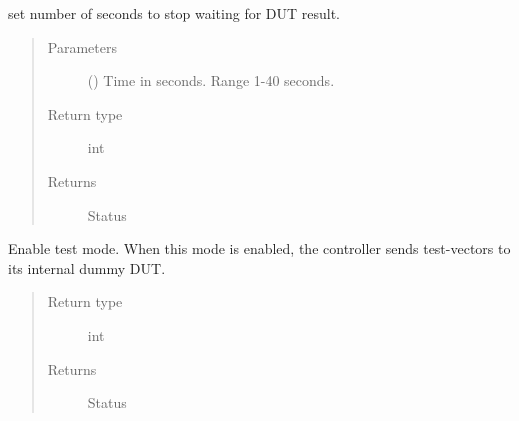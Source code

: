 \documentclass[letterpaper,10pt,english]{sphinxmanual}
\begin{document}
\begin{fulllineitems}
\begin{fulllineitems}
\begin{fulllineitems}
\end{fulllineitems}


\end{fulllineitems}


\begin{fulllineitems}
\label{\detokenize{reference_doc:fobos.Basys3Ctrl.setTimeout}}
set number of seconds to stop waiting for DUT result.
\begin{quote}\begin{description}
\item[{Parameters}] \leavevmode
{} () \textendash{} Time in seconds. Range 1-40 seconds.

\item[{Return type}] \leavevmode
int

\item[{Returns}] \leavevmode
Status

\end{description}\end{quote}

\end{fulllineitems}


\begin{fulllineitems}
\label{\detokenize{reference_doc:fobos.Basys3Ctrl.enableTestMode}}
Enable test mode. When this mode is enabled, the controller sends test-vectors to its internal dummy DUT.
\begin{quote}\begin{description}
\item[{Return type}] \leavevmode
int

\item[{Returns}] \leavevmode
Status

\end{description}\end{quote}

\end{fulllineitems}



\end{fulllineitems}
\end{document}
